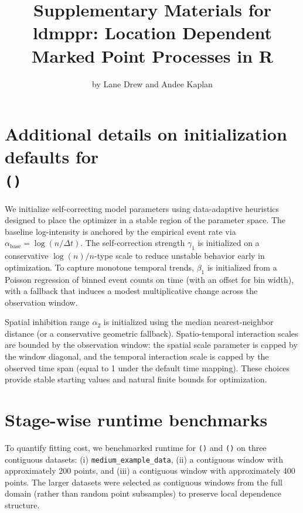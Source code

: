 \documentclass[a4paper]{report}
\begin{document}


\begin{article}
\title{Supplementary Materials for ldmppr: Location Dependent Marked Point Processes in R}


\author{by Lane Drew and Andee Kaplan}

\maketitle

\appendix

\section{Additional details on initialization defaults for \\ \texttt{()}}\label{appA}

We initialize self-correcting model parameters using data-adaptive
heuristics designed to place the optimizer in a stable region of the
parameter space. The baseline log-intensity is anchored by the empirical
event rate via \(\alpha_{\text{base}} = \log(n / \Delta t)\). The
self-correction strength \(\gamma_1\) is initialized on a conservative
\(\log(n) / n\)-type scale to reduce unstable behavior early in
optimization. To capture monotone temporal trends, \(\beta_1\) is
initialized from a Poisson regression of binned event counts on time
(with an offset for bin width), with a fallback that induces a modest
multiplicative change across the observation window.

Spatial inhibition range \(\alpha_2\) is initialized using the median
nearest-neighbor distance (or a conservative geometric fallback).
Spatio-temporal interaction scales are bounded by the observation
window: the spatial scale parameter is capped by the window diagonal,
and the temporal interaction scale is capped by the observed time span
(equal to 1 under the default time mapping). These choices provide
stable starting values and natural finite bounds for optimization.

\section{Stage-wise runtime benchmarks}\label{appB}

To quantify fitting cost, we benchmarked runtime for
\texttt{()} and
\texttt{()} on three contiguous datasets:
(i) \texttt{medium\_example\_data}, (ii) a contiguous window with
approximately 200 points, and (iii) a contiguous window with
approximately 400 points. The larger datasets were selected as
contiguous windows from the full domain (rather than random point
subsamples) to preserve local dependence structure.


\end{article}
\end{document}
